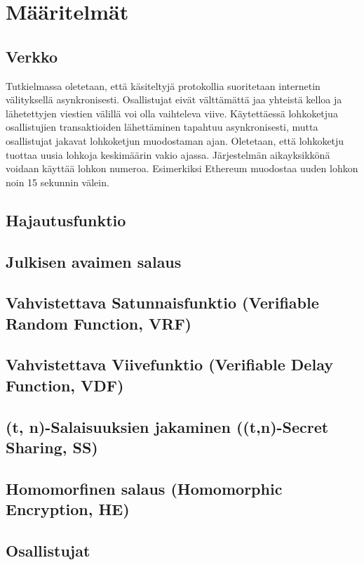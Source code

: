 \chapter{Määritelmät\label{methods}}

\section{Verkko}
Tutkielmassa oletetaan, että käsiteltyjä protokollia suoritetaan internetin välityksellä asynkronisesti. Osallistujat eivät välttämättä jaa yhteistä kelloa ja lähetettyjen viestien välillä voi olla vaihteleva viive. Käytettäessä lohkoketjua osallistujien transaktioiden lähettäminen tapahtuu asynkronisesti, mutta osallistujat jakavat lohkoketjun muodostaman ajan. Oletetaan, että lohkoketju tuottaa uusia lohkoja keskimäärin vakio ajassa. Järjestelmän aikayksikkönä voidaan käyttää lohkon numeroa. Esimerkiksi Ethereum muodostaa uuden lohkon noin 15 sekunnin välein.

\section{Hajautusfunktio}

\section{Julkisen avaimen salaus}

\section{Vahvistettava Satunnaisfunktio (Verifiable Random Function, VRF)}

\section{Vahvistettava Viivefunktio (Verifiable Delay Function, VDF)}

\section{(t, n)-Salaisuuksien jakaminen ((t,n)-Secret Sharing, SS)}

\section{Homomorfinen salaus (Homomorphic Encryption, HE)}

\section{Osallistujat}

